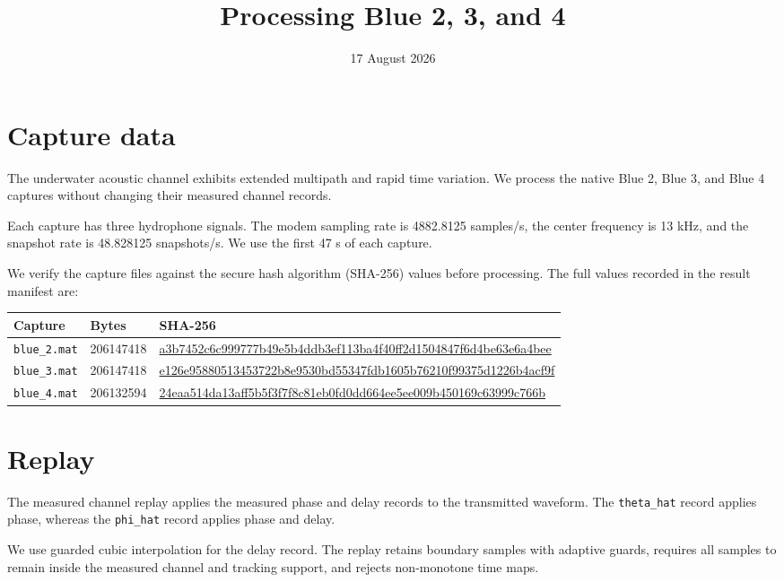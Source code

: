 \documentclass[11pt]{article}
\title{Processing Blue 2, 3, and 4}
\date{17 August 2026}
\begin{document}
\maketitle

\section{Capture data}

The underwater acoustic channel exhibits extended multipath and rapid time
variation.  We process the native Blue 2, Blue 3, and Blue 4 captures without
changing their measured channel records.

Each capture has three hydrophone signals.  The modem sampling rate is
4882.8125 samples/s, the center frequency is 13 kHz, and the snapshot rate is
48.828125 snapshots/s.  We use the first 47 s of each capture.

We verify the capture files against the secure hash algorithm (SHA-256) values
before processing.  The full values recorded in the result manifest are:

\begin{center}
\small
\begin{tabular}{@{}lll@{}}
\toprule
Capture & Bytes & SHA-256 \\
\midrule
\texttt{blue\_2.mat} & 206147418 &
\url{a3b7452c6c999777b49e5b4ddb3ef113ba4f40ff2d1504847f6d4be63e6a4bee} \\
\texttt{blue\_3.mat} & 206147418 &
\url{e126e95880513453722b8e9530bd55347fdb1605b76210f99375d1226b4acf9f} \\
\texttt{blue\_4.mat} & 206132594 &
\url{24eaa514da13aff5b5f3f7f8c81eb0fd0dd664ee5ee009b450169c63999c766b} \\
\bottomrule
\end{tabular}
\end{center}

\section{Replay}

The measured channel replay applies the measured phase and delay records to
the transmitted waveform.  The \texttt{theta\_hat} record applies phase,
whereas the \texttt{phi\_hat} record applies phase and delay.

We use guarded cubic interpolation for the delay record.  The replay retains
boundary samples with adaptive guards, requires all samples to remain inside
the measured channel and tracking support, and rejects non-monotone time maps.
\end{document}
